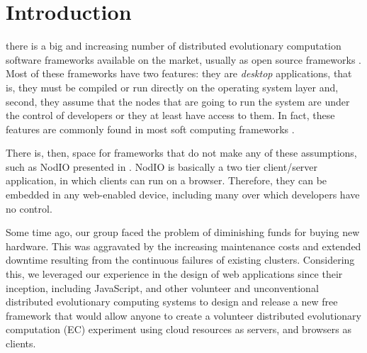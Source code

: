 \documentclass[journal,onecolumn]{IEEEtran}
\begin{document}
\section{Introduction}

 there is a big and increasing number of
distributed evolutionary computation software frameworks available on
the market, usually as open source frameworks \cite{Parejo12Survey}. 
Most of these frameworks have 
two features: they are {\em desktop} applications, that is, they must
be compiled or run directly on the operating system layer and, second,
they assume that the nodes that are going to run the system are under
the control of developers or they at least have access to them. In
fact, these features are commonly found in most soft computing
frameworks \cite{7094263}. 

There is, then, space for frameworks that do not make any of these
assumptions, such as {\sf NodIO} presented in \cite{}. {\sf NodIO} is basically 
a two tier client/server 
application, in which clients can run on a browser. 
Therefore, they can be embedded in any web-enabled device, including many over which 
developers have no control.

Some time ago, our group faced the problem of diminishing funds for
buying new hardware. This was aggravated by the increasing maintenance costs and
extended downtime resulting from the continuous failures of existing
clusters.
Considering this, we leveraged our experience in the design of web
applications since their inception, including JavaScript, and other
volunteer and
unconventional distributed evolutionary computing systems to 
design and release a new free framework that would allow anyone to
create a volunteer distributed evolutionary computation (EC) experiment using cloud resources as
servers, and browsers as clients.
\end{document}
